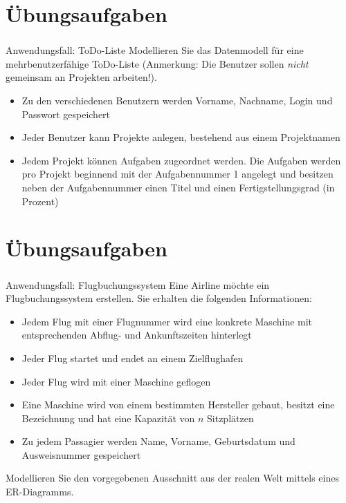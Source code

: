 \section*{Übungsaufgaben}
\begin{frame}[t]
\frametitle{\insertsection}
\begin{alertblock}{Anwendungsfall: ToDo-Liste}
Modellieren Sie das Datenmodell für eine mehrbenutzerfähige ToDo-Liste (Anmerkung: Die Benutzer sollen \textit{nicht} gemeinsam an Projekten arbeiten!). 

\begin{itemize}
\label{todolist}
\item Zu den verschiedenen Benutzern werden Vorname, Nachname, Login und Passwort gespeichert 
\item Jeder Benutzer kann Projekte anlegen, bestehend aus einem Projektnamen 
\item Jedem Projekt können Aufgaben zugeordnet werden. Die Aufgaben werden pro Projekt beginnend mit der Aufgabennummer 1 angelegt und besitzen neben der Aufgabennummer einen Titel und einen Fertigstellungsgrad (in Prozent)
\end{itemize}
\end{alertblock}
\end{frame}

\section*{Übungsaufgaben}
\begin{frame}[t]
\frametitle{\insertsection}
\begin{alertblock}{Anwendungsfall: Flugbuchungssystem}
Eine Airline möchte ein Flugbuchungssystem erstellen. Sie erhalten die folgenden Informationen: 
\begin{itemize}
\item Jedem Flug mit einer Flugnummer wird eine konkrete Maschine mit entsprechenden Abflug- und Ankunftszeiten hinterlegt 
\item Jeder Flug startet und endet an einem Zielflughafen
\item Jeder Flug wird mit einer Maschine geflogen 
\item Eine Maschine wird von einem bestimmten Hersteller gebaut, besitzt eine Bezeichnung und hat eine Kapazität von $n$ Sitzplätzen
\item Zu jedem Passagier werden Name, Vorname, Geburtsdatum und Ausweisnummer gespeichert
\end{itemize}
Modellieren Sie den vorgegebenen Ausschnitt aus der realen Welt mittels eines ER-Diagramms.
\end{alertblock}
\end{frame}

